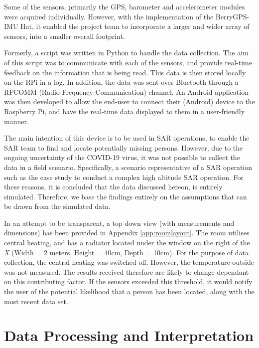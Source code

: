 \documentclass{ueacmpstyle}
\begin{document}
        Some of the sensors, primarily the GPS, barometer and accelerometer modules were acquired individually. However, with the implementation of the BerryGPS-IMU Hat, it enabled the project team to incorporate a larger and wider array of sensors, into a smaller overall footprint. 
        
        Formerly, a script was written in Python to handle the data collection. The aim of this script was to communicate with each of the sensors, and provide real-time feedback on the information that is being read. This data is then stored locally on the RPi in a log. In addition, the data was sent over Bluetooth through a RFCOMM (Radio-Frequency Communication) channel. An Android application was then developed to allow the end-user to connect their (Android) device to the Raspberry Pi, and have the real-time data displayed to them in a user-friendly manner. 
        
        The main intention of this device is to be used in SAR operations, to enable the SAR team to find and locate potentially missing persons. However, due to the ongoing uncertainty of the COVID-19 virus, it was not possible to collect the data in a field scenario. Specifically, a scenario representative of a SAR operation such as the \cite{McRae2019} case study to conduct a complex high altitude SAR operation. For these reasons, it is concluded that the data discussed hereon, is entirely simulated. Therefore, we base the findings entirely on the assumptions that can be drawn from the simulated data.
        
        In an attempt to be transparent, a top down view (with measurements and dimensions) has been provided in Appendix \ref{app:roomlayout}. The room utilises central heating, and has a radiator located under the window on the right of the \textit{X} (Width = 2 meters, Height = 40cm, Depth = 10cm). For the purpose of data collection, the central heating was switched off. However, the temperature outside was not measured. The results received therefore are likely to change dependant on this contributing factor. If the sensors exceeded this threshold, it would notify the user of the potential likelihood that a person has been located, along with the most recent data set.
        
    
    \section{Data Processing and Interpretation} \label{Sec: Data Processing}
        
\end{document}
